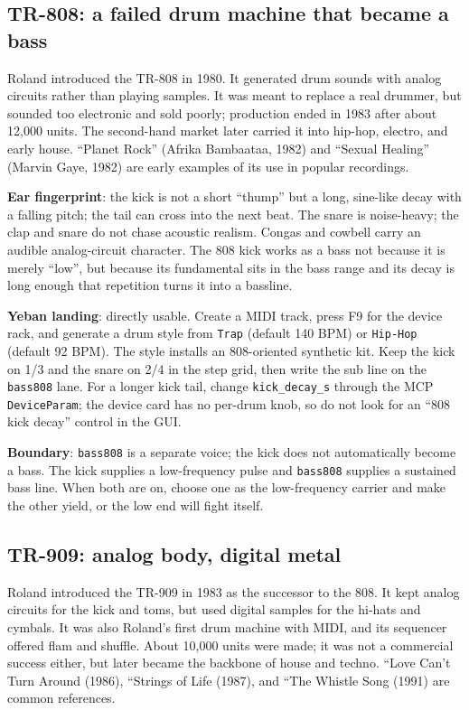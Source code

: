 \subsection{TR-808: a failed drum machine that became a bass}
\label{sec:iconic-808}

Roland introduced the TR-808 in 1980. It generated drum sounds with analog
circuits rather than playing samples. It was meant to replace a real drummer,
but sounded too electronic and sold poorly; production ended in 1983 after
about 12,000 units. The second-hand market later carried it into hip-hop,
electro, and early house. ``Planet Rock'' (Afrika Bambaataa, 1982) and
``Sexual Healing'' (Marvin Gaye, 1982) are early examples of its use in
popular recordings.

\textbf{Ear fingerprint}: the kick is not a short ``thump'' but a long,
sine-like decay with a falling pitch; the tail can cross into the next beat.
The snare is noise-heavy; the clap and snare do not chase acoustic realism.
Congas and cowbell carry an audible analog-circuit character. The 808 kick
works as a bass not because it is merely ``low'', but because its
fundamental sits in the bass range and its decay is long enough that
repetition turns it into a bassline.

\textbf{Yeban landing}: directly usable. Create a MIDI track, press F9 for
the device rack, and generate a drum style from \texttt{Trap} (default
140 BPM) or \texttt{Hip-Hop} (default 92 BPM). The style installs an
808-oriented synthetic kit. Keep the kick on 1/3 and the snare on 2/4 in the
step grid, then write the sub line on the \texttt{bass808} lane. For a longer
kick tail, change \texttt{kick\_decay\_s} through the MCP
\texttt{DeviceParam}; the device card has no per-drum knob, so do not look
for an ``808 kick decay'' control in the GUI.

\textbf{Boundary}: \texttt{bass808} is a separate voice; the kick does not
automatically become a bass. The kick supplies a low-frequency pulse and
\texttt{bass808} supplies a sustained bass line. When both are on, choose one
as the low-frequency carrier and make the other yield, or the low end will
fight itself.

\subsection{TR-909: analog body, digital metal}
\label{sec:iconic-909}

Roland introduced the TR-909 in 1983 as the successor to the 808. It kept
analog circuits for the kick and toms, but used digital samples for the hi-hats
and cymbals. It was also Roland's first drum machine with MIDI, and its
sequencer offered flam and shuffle. About 10,000 units were made; it was not a
commercial success either, but later became the backbone of house and techno.
``Love Can’t Turn Around (1986), ``Strings of Life (1987), and
``The Whistle Song (1991) are common references.

